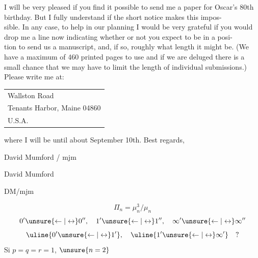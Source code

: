 I will be very pleased if you find it possible to send me a paper for Oscar's 80th birthday. But I fully understand if the short notice makes this impos-\\
sible. In any case, to help in our planning I would be very grateful if you would drop me a line now indicating whether or not you expect to be in a posi-\\
tion to send us a manuscript, and, if so, roughly what length it might be. (We have a maximum of 460 printed pages to use and if we are deluged there is a small chance that we may have to limit the length of individual submissions.) Please write me at:
\begin{tabular}{l}
Wallston Road\\
Tenants Harbor, Maine 04860\\
U.S.A.
\end{tabular}
where I will be until about September 10th.
Best regards,

David Mumford / mjm

David Mumford

DM/mjm

\[\Pi_n=\mu_n^3/\mu_n\]
\[
0'\unsure{\leftarrow|\leftrightarrow}0'',\quad
1'\unsure{\leftarrow|\leftrightarrow}1'',\quad
\infty'\unsure{\leftarrow|\leftrightarrow}\infty''
\]
\[
\uline{0'\unsure{\leftarrow|\leftrightarrow}1'},\quad
\uline{1'\unsure{\leftarrow|\leftrightarrow}\infty'}\quad ?
\]
Si $p=q=r=1$, $\unsure{n=2}$

